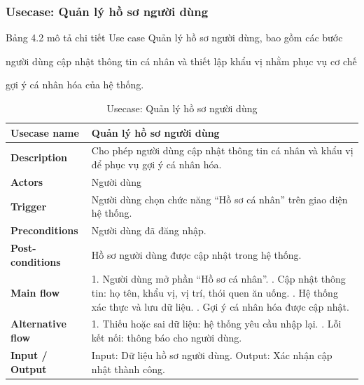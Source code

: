 \subsubsection{Usecase: Quản lý hồ sơ người dùng}

Bảng 4.2 mô tả chi tiết Use case Quản lý hồ sơ người dùng, bao gồm các bước

người dùng cập nhật thông tin cá nhân và thiết lập khẩu vị nhằm phục vụ cơ chế

gợi ý cá nhân hóa của hệ thống.


\begingroup
\renewcommand{\arraystretch}{1.25}
\begin{longtable}{|p{4cm}|p{10cm}|}
\caption{Usecase: Quản lý hồ sơ người dùng} \\
\endfirsthead

\endhead

\endfoot

\endlastfoot

\hline

\textbf{Usecase name} &
Quản lý hồ sơ người dùng \\
\hline

\textbf{Description} &
Cho phép người dùng cập nhật thông tin cá nhân và khẩu vị để phục vụ gợi ý cá nhân hóa. \\
\hline

\textbf{Actors} &
Người dùng \\
\hline

\textbf{Trigger} &
Người dùng chọn chức năng ``Hồ sơ cá nhân'' trên giao diện hệ thống. \\
\hline

\textbf{Preconditions} &
Người dùng đã đăng nhập. \\
\hline

\textbf{Post-conditions} &
Hồ sơ người dùng được cập nhật trong hệ thống. \\
\hline

\textbf{Main flow} &
1. Người dùng mở phần ``Hồ sơ cá nhân''. \newline 2. Cập nhật thông tin: họ tên, khẩu vị, vị trí, thói quen ăn uống. \newline 3. Hệ thống xác thực và lưu dữ liệu. \newline 4. Gợi ý cá nhân hóa được cập nhật. \\
\hline

\textbf{Alternative flow} &
1. Thiếu hoặc sai dữ liệu: hệ thống yêu cầu nhập lại. \newline 2. Lỗi kết nối: thông báo cho người dùng. \\
\hline

\textbf{Input / Output} &
Input: Dữ liệu hồ sơ người dùng. \newline Output: Xác nhận cập nhật thành công. \\
\hline

\end{longtable}
\endgroup


